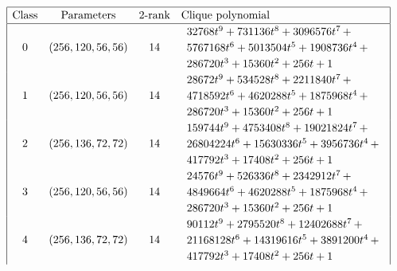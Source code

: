 \begin{table}[!bhpt] %
%
\small{}
\begin{align*}
\def\arraystretch{1.2}
\begin{array}{|cccl|}
\hline
\text{Class} &
\text{Parameters} &
\text{2-rank} &
\text{Clique polynomial}
\\
\hline
0 &
(256, 120, 56, 56) &
14 &
\begin{array}{l}
32768t^{9} + 731136t^{8} + 3096576t^{7}
\,+
\\
 5767168t^{6} + 5013504t^{5} + 1908736t^{4}
\,+
\\
 286720t^{3} + 15360t^{2} + 256t + 1
\end{array}
\\
1 &
(256, 120, 56, 56) &
14 &
\begin{array}{l}
28672t^{9} + 534528t^{8} + 2211840t^{7}
\,+
\\
 4718592t^{6} + 4620288t^{5} + 1875968t^{4}
\,+
\\
 286720t^{3} + 15360t^{2} + 256t + 1
\end{array}
\\
2 &
(256, 136, 72, 72) &
14 &
\begin{array}{l}
159744t^{9} + 4753408t^{8} + 19021824t^{7}
\,+
\\
 26804224t^{6} + 15630336t^{5} + 3956736t^{4}
\,+
\\
 417792t^{3} + 17408t^{2} + 256t + 1
\end{array}
\\
3 &
(256, 120, 56, 56) &
14 &
\begin{array}{l}
24576t^{9} + 526336t^{8} + 2342912t^{7}
\,+
\\
 4849664t^{6} + 4620288t^{5} + 1875968t^{4}
\,+
\\
 286720t^{3} + 15360t^{2} + 256t + 1
\end{array}
\\
4 &
(256, 136, 72, 72) &
14 &
\begin{array}{l}
90112t^{9} + 2795520t^{8} + 12402688t^{7}
\,+
\\
 21168128t^{6} + 14319616t^{5} + 3891200t^{4}
\,+
\\
 417792t^{3} + 17408t^{2} + 256t + 1
\end{array}
\\

\end{array}
\end{align*}
\end{table}
